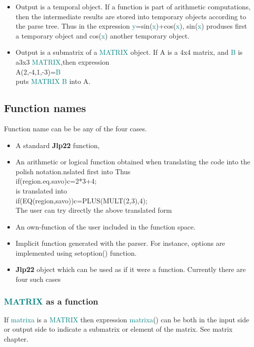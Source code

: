 {\begin{itemize}
\item Output is a temporal object. If a function is part of arithmetic computations, then 
the intermediate results are stored into temporary objects according to the parse tree. Thus in the 
expression \textcolor{teal}{y}=\textcolor{VioletRed}{sin}(\textcolor{teal}{x})+\textcolor{VioletRed}{cos}(\textcolor{teal}{x}), \textcolor{VioletRed}{sin}(\textcolor{teal}{x}) produses first a temporary object and \textcolor{VioletRed}{cos}(\textcolor{teal}{x}) 
another temporary object. 
\item Output is a submatrix of a \textcolor{teal}{MATRIX} object. If A is a 4x4 matrix, and 
\textcolor{teal}{B} is a3x3 \textcolor{teal}{MATRIX},then expression\\ 
A(2,-4,1,-3)=\textcolor{teal}{B}\\ 
puts \textcolor{teal}{MATRIX} \textcolor{teal}{B} into A. 
\end{itemize} 
\subsection{Function names} 
\label{functionname} 
 
Function name can be be any of the four cases. 
\begin{itemize} 
 
\item A standard \textbf{Jlp22} function, 
\item An arithmetic or logical function obtained when translating the code into the polish notation.nslated first into 
Thus \\ 
\textcolor{VioletRed}{if}(region.eq.savo)c=2*3+4;\\ 
is translated into \\ 
\textcolor{VioletRed}{if}(\textcolor{VioletRed}{EQ}(region,savo))c=\textcolor{VioletRed}{PLUS}(\textcolor{VioletRed}{MULT}(2,3),4);\\ 
The user can try directly the above translated form 
\item An own-function of the user included in the function space. 
 
\item Implicit function generated with the parser. For instance, options are implemented using 
\textcolor{VioletRed}{setoption}() function. 
\item \textbf{Jlp22} object which can be used as if it were a function. Currently there 
are four such cases 
\end{itemize} 
\subsubsection{\textcolor{teal}{MATRIX} as a function} 
\label{matrixfunc} 
If \textcolor{teal}{matrixa} is a \textcolor{teal}{MATRIX} then expression \textcolor{teal}{matrixa}() can be both in the input side or output side to indicate 
a submatrix or element of the matrix. See matrix chapter. 
}
